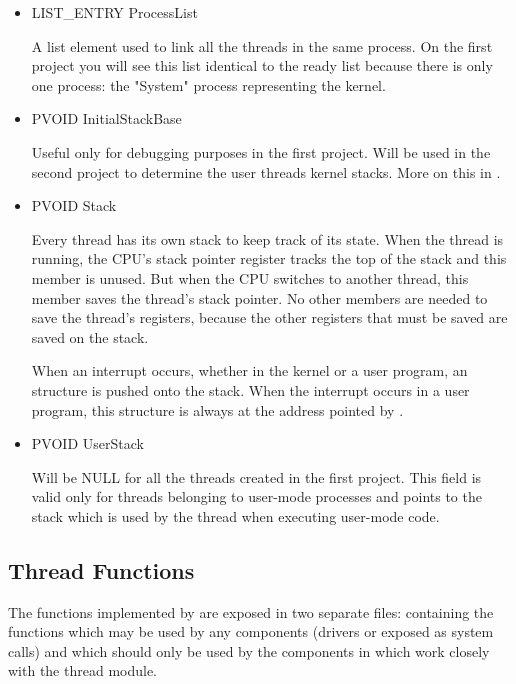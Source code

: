\begin{appendices}
\begin{itemize}
	\item LIST\_ENTRY ProcessList

	A list element used to link all the threads in the same process. On the first project you will
see this list identical to the ready list because there is only one process: the "System" process
representing the \projectname kernel.

	\item PVOID InitialStackBase

	Useful only for debugging purposes in the first project. Will be used in the second project to
determine the user threads kernel stacks. More on this in .

	\item PVOID Stack

	Every thread has its own stack to keep track of its state. When the thread is running, the CPU’s
stack pointer register tracks the top of the stack and this member is unused. But when the CPU
switches to another thread, this member saves the thread’s stack pointer. No other members are 
needed to save the thread’s registers, because the other registers that must be saved are saved on
the stack.

	When an interrupt occurs, whether in the kernel or a user program, an
 structure is pushed onto the stack. When the interrupt occurs in
a user program, this structure is always at the address pointed by .

	\item PVOID UserStack

	Will be NULL for all the threads created in the first project. This field is valid only for
threads belonging to user-mode processes and points to the stack which is used by the thread when
executing user-mode code.
\end{itemize}

\subsection{Thread Functions}

The functions implemented by  are exposed in two separate files: 
containing the functions which may be used by any components (drivers or exposed as system calls)
and  which should only be used by the components in \projectname which
work closely with the thread module.


\end{appendices}

